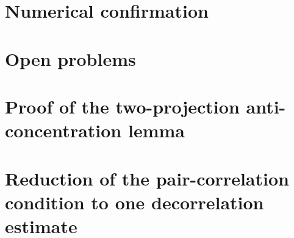 \documentclass[11pt,reqno]{amsart}
\theoremstyle{plain}
\theoremstyle{definition}
\theoremstyle{remark}
\begin{document}
\section{Numerical confirmation}\label{sec:numerics}


\section{Open problems}\label{sec:open}


\appendix
\section{Proof of the two-projection anti-concentration lemma}\label{sec:app-two-proj}


\section{Reduction of the pair-correlation condition to one decorrelation estimate}\label{sec:app-keystone}




\end{document}
